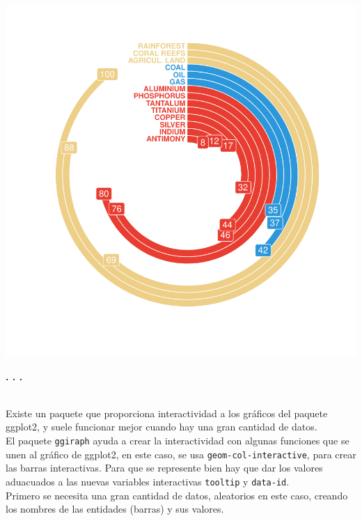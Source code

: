 \documentclass{article}\usepackage[]{graphicx}\usepackage[]{color}
\makeatletter
\def\maxwidth{ %
  \ifdim\Gin@nat@width>\linewidth
    \linewidth
  \else
    \Gin@nat@width
  \fi
}
\newenvironment{knitrout}{}{} %
\makeatother
\begin{document}
\begin{knitrout}
\color{fgcolor}

{\centering \includegraphics[width=\maxwidth]{figure/plot_br_final-1} 

}



\end{knitrout}
\begin{center}
\textbf{. . .}
\end{center}
~\\Existe un paquete que proporciona interactividad a los gr\'aficos del paquete ggplot2, y suele funcionar mejor cuando hay una gran cantidad de datos.~\\
El paquete \texttt{ggiraph}%
ayuda a crear la interactividad con algunas funciones que se unen al gr\'afico de ggplot2, en este caso, se usa \texttt{geom-col-interactive}, para crear las barras interactivas. Para que se represente bien hay que dar los valores aduacuados a las nuevas variables interactivas \texttt{tooltip} y \texttt{data-id}.~\\
Primero se necesita una gran cantidad de datos, aleatorios en este caso, creando los nombres de las entidades (barras) y sus valores.
\end{document}
